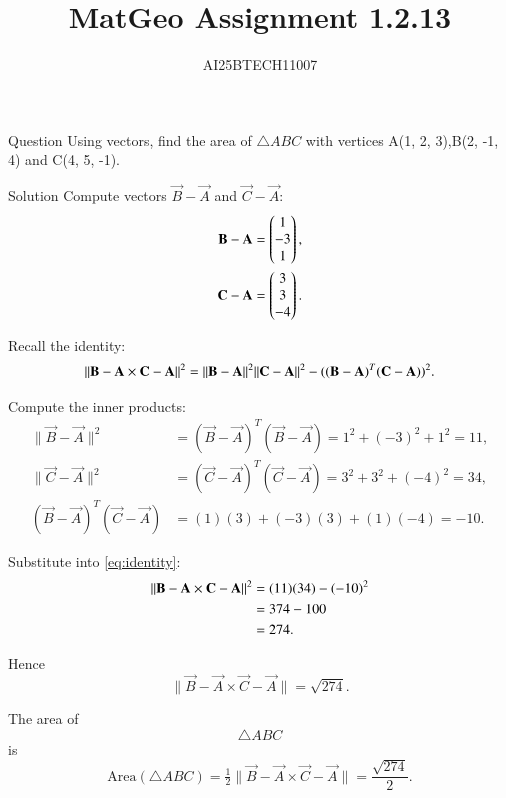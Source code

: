 \documentclass{beamer}
\title 
{MatGeo Assignment 1.2.13}
\author
{AI25BTECH11007}
\begin{document}
\frame{\titlepage}
\begin{frame}{Question}
Using vectors, find the area of $\triangle ABC$ with vertices A(1, 2, 3),B(2, -1, 4) and C(4, 5, -1).
\end{frame}
\begin{frame}{Solution}
Compute vectors $\vec{B}-\vec{A}$ and $\vec{C}-\vec{A}$:\\
 
\begin{align}
\vec{B}-\vec{A} = \myvec{1\\-3\\1}, \label{eq:AB}\\
\vec{C}-\vec{A} = \myvec{3\\3\\-4}. \label{eq:AC}
\end{align}

Recall the identity:
\begin{equation}
\|\vec{B}-\vec{A}\\ \times \vec{C}-\vec{A}\|^2
= \|\vec{B}-\vec{A}\|^2 \|\vec{C}-\vec{A}\|^2 - ((\vec{B}-\vec{A})^T(\vec{C}-\vec{A}))^2. \label{eq:identity}
\end{equation}
\end{frame}
\begin{frame}
    

Compute the inner products:
\begin{align}
\|\vec{B}-\vec{A}\|^2 &= (\vec{B}-\vec{A})^T (\vec{B}-\vec{A}) = 1^2 + (-3)^2 + 1^2 = 11, \label{eq:ABsq}\\
\|\vec{C}-\vec{A}\|^2 &= (\vec{C}-\vec{A})^T (\vec{C}-\vec{A}) = 3^2 + 3^2 + (-4)^2 = 34, \label{eq:ACsq}\\
(\vec{B}-\vec{A})^T(\vec{C}-\vec{A}) &= (1)(3) + (-3)(3) + (1)(-4) = -10. \label{eq:dot}
\end{align}

Substitute into \eqref{eq:identity}:
\begin{align}
\|\vec{B}-\vec{A} \times \vec{C}-\vec{A}\|^2 &= (11)(34) - (-10)^2 \notag\\
&= 374 - 100 \notag\\
&= 274. \label{eq:crosssq}
\end{align}

\end{frame}
\begin{frame}
 Hence
\begin{equation}
\|\vec{B}-\vec{A}\times \vec{C}-\vec{A}\| = \sqrt{274}. \label{eq:crossnorm}
\end{equation}

 The area of $$\triangle ABC$$ is
\begin{equation}
\text{Area}(\triangle ABC) 
= \tfrac{1}{2}\|\vec{B}-\vec{A}\times\vec{C}-\vec{A}\|
= \frac{\sqrt{274}}{2}. \label{eq:area}
\end{equation}

\end{frame}
\end{document}
